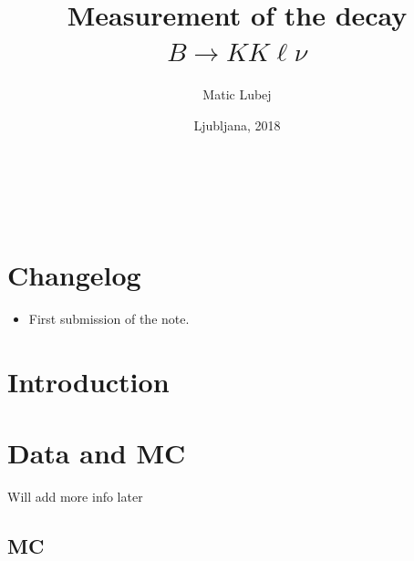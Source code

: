 \documentclass[oneside,a4paper,openany,12pt]{scrbook}
\title{\huge {Measurement of the decay $B \to KK\ell\nu$}}
\author{Matic Lubej}
\begin{document}
\date{Ljubljana, 2018}
\begin{titlingpage} %
\begin{center}

\textbf{\thetitle}\\
\theauthor \\
\vspace{0cm}
\thedate
\end{center}
\end{titlingpage}

\pagestyle{plain}

\chapter*{Changelog}

\begin{itemize}
\item First submission of the note.
\end{itemize}

\tableofcontents
{}



\chapter{Introduction}



\chapter{Data and MC}

Will add more info later

\section{MC}
\end{document}
